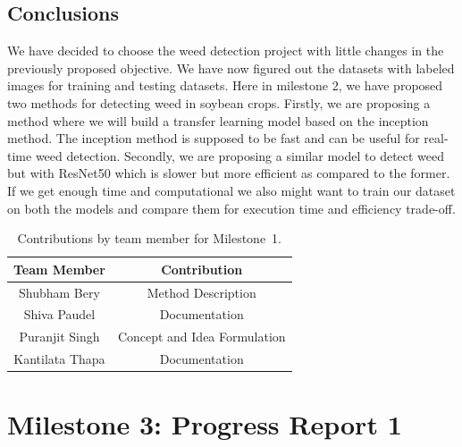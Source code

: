 \documentclass{report}
\begin{document}
\section{Conclusions}

We have decided to choose the weed detection project with little changes in the previously proposed objective. We have now figured out the datasets with labeled images for training and testing datasets. Here in milestone 2, we have proposed two methods for detecting weed in soybean crops. Firstly, we are proposing a method where we will build a transfer learning model based on the inception method. The inception method is supposed to be fast and can be useful for real-time weed detection. Secondly, we are proposing a similar model to detect weed but with ResNet50 which is slower but more efficient as compared to the former. If we get enough time and computational we also might want to train our dataset on both the models and compare them for execution time and efficiency trade-off.

\begin{table}[h]
    \caption{Contributions by team member for Milestone~1.}
    \centering
    \begin{tabular}{|c|c|} \hline
    {\bf Team Member}     &  {\bf Contribution}  \\ \hline
    Shubham Bery     & Method Description \\
    Shiva Paudel    & Documentation\\
    Puranjit Singh     & Concept and Idea Formulation \\
    Kantilata Thapa     & Documentation \\ \hline
    \end{tabular}
    \label{tab:contribution1}
\end{table}

\chapter{Milestone 3: Progress Report 1}
\end{document}
